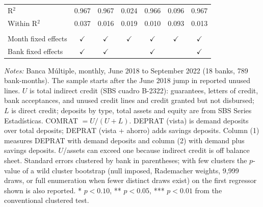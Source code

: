 \begin{table}[!h]
\begin{threeparttable}[b]
\begin{tabular}{lcccccc}
         R$^2$                            & 0.967         & 0.967         & 0.024         & 0.966         & 0.096         & 0.967\\  
         Within R$^2$                     & 0.037         & 0.016         & 0.019         & 0.010         & 0.093         & 0.013\\  
          \\
         Month fixed effects              & $\checkmark$  & $\checkmark$  & $\checkmark$  & $\checkmark$  & $\checkmark$  & $\checkmark$\\   
         Bank fixed effects               & $\checkmark$  & $\checkmark$  &               & $\checkmark$  &               & $\checkmark$\\   
         \bottomrule
      \end{tabular}
      
      \begin{tablenotes}\item \textit{Notes:} Banca M\'ultiple, monthly, June 2018 to September 2022 (18 banks, 789 bank-months). The sample starts after the June 2018 jump in reported unused lines. $U$ is total indirect credit (SBS cuadro B-2322): guarantees, letters of credit, bank acceptances, and unused credit lines and credit granted but not disbursed; $L$ is direct credit; deposits by type, total assets and equity are from SBS Series Estad\'isticas. COMRAT $= U/(U+L)$. DEPRAT (vista) is demand deposits over total deposits; DEPRAT (vista + ahorro) adds savings deposits. Column (1) measures DEPRAT with demand deposits and column (2) with demand plus savings deposits. $U$/assets can exceed one because indirect credit is off balance sheet. Standard errors clustered by bank in parentheses; with few clusters the $p$-value of a wild cluster bootstrap (null imposed, Rademacher weights, 9,999 draws, or full enumeration when fewer distinct draws exist) on the first regressor shown is also reported. * $p<0.10$, ** $p<0.05$, *** $p<0.01$ from the conventional clustered test.
      \end{tablenotes}
   \end{threeparttable}
\end{table}


